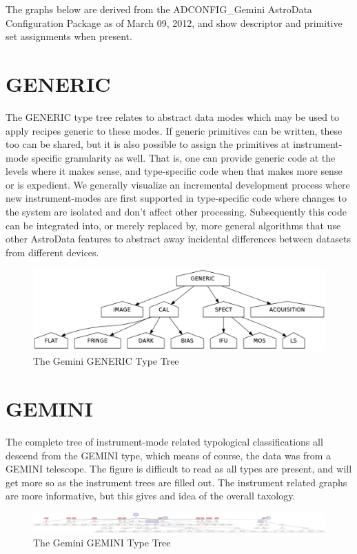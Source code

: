 \documentclass[letterpaper,10pt,english]{sphinxmanual}
\begin{document}
The graphs below are derived from the ADCONFIG\_Gemini AstroData Configuration
Package as of March 09, 2012, and show descriptor and primitive set assignments when present.


\section{GENERIC}
\label{appendix_typegraphs:generic}
The GENERIC type tree relates to abstract data modes which may be used to apply recipes generic to these modes.  If generic primitives
can be written, these too can be shared, but it is also possible to assign the primitives at instrument-mode specific granularity as
well. That is, one can provide generic code at the levels where it makes sense, and type-specific code when that makes more sense or is
expedient.  We generally visualize an incremental development process where new instrument-modes are first supported  in type-specific code where
changes to the system are isolated and don't affect other processing. Subsequently this code can be integrated into, or merely replaced
by, more general algorithms that use other AstroData features to abstract away incidental differences between datasets from different
devices.
\begin{figure}[htbp]
\centering
\capstart

\includegraphics[width=0.900\linewidth]{GENERIC-tree-pd.png}
\caption{The Gemini GENERIC Type Tree}\end{figure}


\section{GEMINI}
\label{appendix_typegraphs:gemini}
The complete tree of instrument-mode related typological classifications all
descend from the GEMINI type, which means of course, the data was from a
GEMINI telescope. The figure is difficult to read as all types are present, and
will get more so as the instrument trees are filled out.  The instrument related
graphs are more informative, but this gives and idea of the overall taxology.
\begin{figure}[htbp]
\centering
\capstart

\includegraphics[width=1.000\linewidth]{GEMINI-tree-pd.png}
\caption{The Gemini GEMINI Type Tree}\end{figure}
\end{document}
